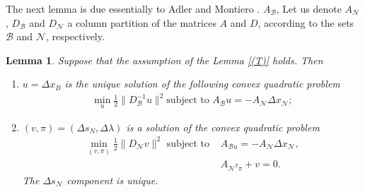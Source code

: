 \documentclass[a4paper,10 pt,titlepage,twoside]{book}
\theoremstyle{plain}
\newtheorem{lem}[thm]{Lemma}
\theoremstyle{definition}
\theoremstyle{remark}
\begin{document}
The next lemma is due essentially to Adler and Montiero \cite{ADL}. $A_{\mathcal{B}}$,  Let us denote $A_{\mathcal{N}}$, $D_{\mathcal{B}}$ and $D_{\mathcal{N}}$ a column partition of the matrices $A$ and $D$, according to the sets $\mathcal{B}$ and $\mathcal{N}$, respectively.
\begin{lem}
	Suppose that the assumption of the Lemma \ref{(T)} holds. Then
	\begin{enumerate}
		\item $u = \Delta x_{B}$ is the unique solution of the following convex quadratic problem
		\begin{align} \label{(U)}
		\min\limits_{u}\frac{1}{2}\lVert D_{\mathcal{B}}^{-1}u\rVert^{2} \text{subject to }A_{\mathcal{B}}u = -A_{\mathcal{N}}\Delta x_{\mathcal{N}};
		\end{align}
		\item $(v, \pi) = (\Delta s_{N}, \Delta \lambda)$ is a solution of the convex quadratic problem
		\begin{align}
		\min\limits_{(v, \pi)}\frac{1}{2}\lVert D_{\mathcal{N}}v\rVert^{2} \text{ subject to } &A_{\mathcal{B}u} = -A_{\mathcal{N}}\Delta x_{\mathcal{N}},\label{44}\\
		&A_{\mathcal{N}^{T}\pi}+ v =0.\label{45}		 
		\end{align}
		The $\Delta s_{\mathcal{N}}$ component is unique.
	\end{enumerate} 
\end{lem} 
\end{document}
